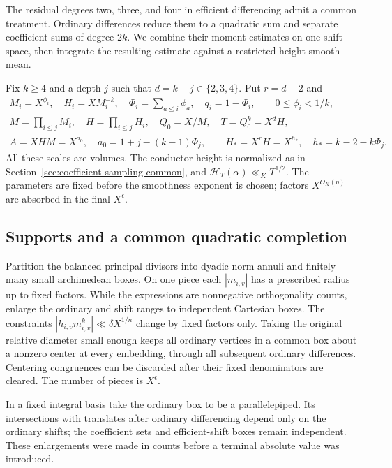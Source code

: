 \documentclass[11pt]{amsart}
\theoremstyle{definition}
\numberwithin{equation}{section}
\begin{document}
The residual degrees two, three, and four in efficient differencing
admit a common treatment. Ordinary differences reduce them to a
quadratic sum and separate coefficient sums of degree $2k$.
We combine their moment estimates on one shift space, then integrate
the resulting estimate against a restricted-height smooth mean.

Fix $k\ge4$ and a depth $j$ such that $d=k-j\in\{2,3,4\}$.
Put $r=d-2$ and
\[
 \begin{gathered}
 M_i=X^{\phi_i},\quad H_i=XM_i^{-k},\quad
 \Phi_i=\sum_{a\le i}\phi_a,\quad q_i=1-\Phi_i,
 \qquad0\le\phi_i<1/k,\\
 M=\prod_{i\le j}M_i,\quad H=\prod_{i\le j}H_i,\quad
 Q_0=X/M,\quad T=Q_0^k=X^dH,\\
 A=XHM=X^{a_0},\quad a_0=1+j-(k-1)\Phi_j,\qquad
 H_*=X^rH=X^{h_*},\quad h_*=k-2-k\Phi_j.
 \end{gathered}
\]
All these scales are volumes. The conductor height is normalized
as in Section~\ref{sec:coefficient-sampling-common}, and
$\mathcal H_T(\alpha)\ll_KT^{1/2}$. The parameters are fixed before
the smoothness exponent is chosen; factors $X^{O_K(\eta)}$ are
absorbed in the final $X^\epsilon$.

\subsection{Supports and a common quadratic completion}

Partition the balanced principal divisors into dyadic norm annuli
and finitely many small archimedean boxes. On one piece each
$|m_{i,v}|$ has a prescribed radius up to fixed factors.
While the expressions are nonnegative orthogonality counts,
enlarge the ordinary and shift ranges to independent Cartesian
boxes. The constraints $|h_{i,v}m_{i,v}^k|\ll\delta X^{1/n}$
change by fixed factors only. Taking the original relative
diameter small enough keeps all ordinary vertices in a common
box about a nonzero center at every embedding, through all
subsequent ordinary differences. Centering congruences can be
discarded after their fixed denominators are cleared.
The number of pieces is $X^\epsilon$.

In a fixed integral basis take the ordinary box to be a
parallelepiped. Its intersections with translates after ordinary
differencing depend only on the ordinary shifts; the coefficient
sets and efficient-shift boxes remain independent. These
enlargements were made in counts before a terminal absolute value
was introduced.
\end{document}

